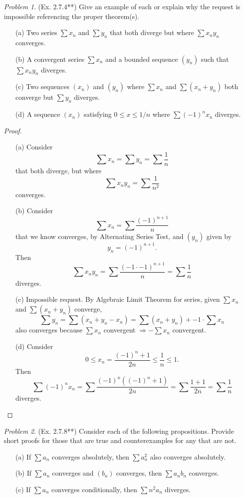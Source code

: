 \documentclass[11pt,twoside, reqno]{amsart}
\theoremstyle{remark}
\newtheorem{Prob}{Problem}
\renewcommand{\implies}{\Rightarrow}
\begin{document}
\begin{Prob}(Ex. 2.7.4**) Give an example of each or explain why the request is impossible referencing the proper theorem(s).
\begin{enumerate}
    \item [(a)] Two series $\sum x_n$ and $\sum y_n$ that both diverge but where $\sum x_ny_n$ converges.
    \item [(b)] A convergent series $\sum x_n$ and a bounded sequence $(y_n)$ such that $\sum x_ny_n$ diverges.
    \item [(c)] Two sequences $(x_n)$ and $(y_n)$ where $\sum x_n$ and $\sum (x_n + y_n)$ both converge but $\sum y_n$ diverges.
    \item [(d)] A sequence $(x_n)$ satisfying $0 \leq x \leq 1/n$ where $\sum (-1)^nx_n$ diverges.
\end{enumerate}
\end{Prob}

\begin{proof}
\begin{enumerate}
    \item [(a)] Consider
    $$
        \sum x_n = \sum y_n = \sum \frac{1}{n}
    $$
    that both diverge, but where
    $$
        \sum x_n y_n = \sum \frac{1}{n^2}
    $$
    converges.
    \item [(b)] Consider
    $$
        \sum x_n = \sum \frac{(-1)^{n+1}}{n}
    $$
    that we know converges, by Alternating Series Test, and $(y_n)$ given by
    $$
        y_n = (-1)^{n+1}.
    $$
    Then
    $$
        \sum x_ny_n = \sum \frac{(-1\cdot -1)^{n+1}}{n} = \sum \frac{1}{n}
    $$
    diverges.
    \item [(c)] Impossible request. By Algebraic Limit Theorem for series, given $\sum x_n$ and $\sum (x_n + y_n)$ converge,
    $$
        \sum y_n = \sum (x_n + y_n - x_n) = \sum (x_n + y_n) + -1 \cdot \sum x_n
    $$
    also converges because $\sum x_n$ convergent $\implies -\sum x_n$ convergent.
    \item [(d)] Consider
    $$
        0 \leq x_n = \frac{(-1)^n+1}{2n} \leq \frac{1}{n} \leq 1.
    $$
    Then
    $$
        \sum (-1)^n x_n = \sum \frac{(-1)^n((-1)^n + 1)}{2n} = \sum \frac{1+1}{2n} = \sum \frac{1}{n}
    $$
    diverges.
\end{enumerate}

\end{proof}

\begin{Prob}(Ex. 2.7.8**) Consider each of the following propositions. Provide short proofs for those that are true and counterexamples for any that are not.
\begin{enumerate}
    \item [(a)] If $\sum a_n$ converges absolutely, then $\sum a_n^2$ also converges absolutely.
    \item [(b)] If $\sum a_n$ converges and $(b_n)$ converges, then $\sum a_nb_n$ converges.
    \item [(c)] If $\sum a_n$ converges conditionally, then $\sum n^2a_n$ diverges.
\end{enumerate}
\end{Prob}
\end{document}
